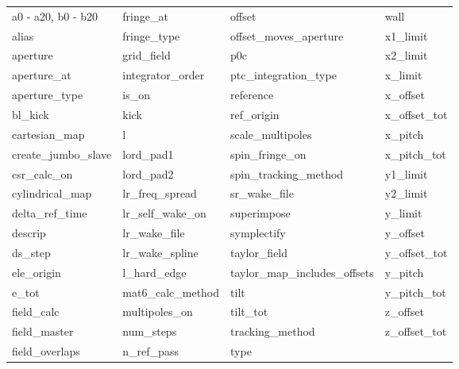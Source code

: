  \begin{tabular}{llll} \toprule
a0 - a20, b0 - b20          & fringe_at                   & offset                      & wall                        \\
alias                       & fringe_type                 & offset_moves_aperture       & x1_limit                    \\
aperture                    & grid_field                  & p0c                         & x2_limit                    \\
aperture_at                 & integrator_order            & ptc_integration_type        & x_limit                     \\
aperture_type               & is_on                       & reference                   & x_offset                    \\
bl_kick                     & kick                        & ref_origin                  & x_offset_tot                \\
cartesian_map               & l                           & scale_multipoles            & x_pitch                     \\
create_jumbo_slave          & lord_pad1                   & spin_fringe_on              & x_pitch_tot                 \\
csr_calc_on                 & lord_pad2                   & spin_tracking_method        & y1_limit                    \\
cylindrical_map             & lr_freq_spread              & sr_wake_file                & y2_limit                    \\
delta_ref_time              & lr_self_wake_on             & superimpose                 & y_limit                     \\
descrip                     & lr_wake_file                & symplectify                 & y_offset                    \\
ds_step                     & lr_wake_spline              & taylor_field                & y_offset_tot                \\
ele_origin                  & l_hard_edge                 & taylor_map_includes_offsets & y_pitch                     \\
e_tot                       & mat6_calc_method            & tilt                        & y_pitch_tot                 \\
field_calc                  & multipoles_on               & tilt_tot                    & z_offset                    \\
field_master                & num_steps                   & tracking_method             & z_offset_tot                \\
field_overlaps              & n_ref_pass                  & type                        &                             \\
 \bottomrule
 \end{tabular}
 \vfill
 
